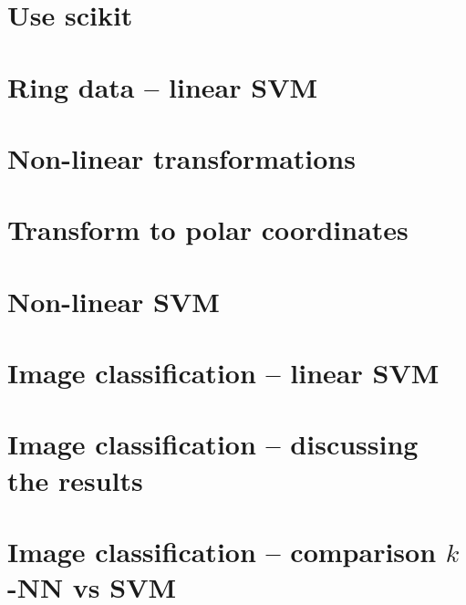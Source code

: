 \documentclass[a4paper,10pt,twoside]{article}
\begin{document}
\section{Use scikit}

\section{Ring data -- linear SVM}

\section{Non-linear transformations}

\section{Transform to polar coordinates}

\section{Non-linear SVM}

\section{Image classification -- linear SVM}

\section{Image classification -- discussing the results}

\section{Image classification -- comparison $k$-NN vs SVM}


%
%
\end{document}
